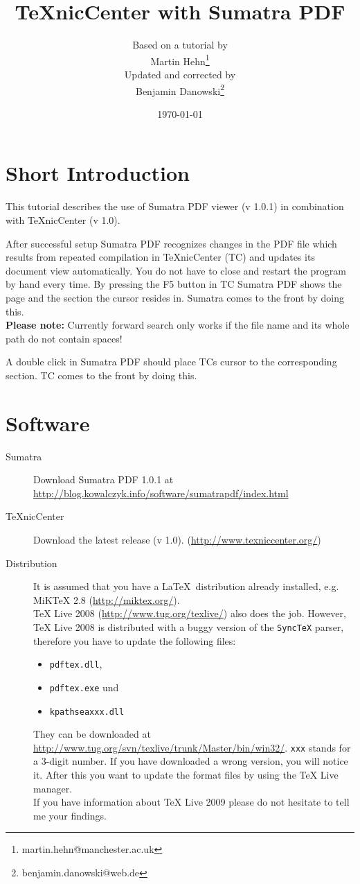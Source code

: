 \documentclass[parskip=half-]{scrartcl}
\title{TeXnicCenter with Sumatra PDF}
\author{Based on a tutorial by\\
Martin Hehn\thanks{martin.hehn@manchester.ac.uk}\\
Updated and corrected by\\
Benjamin Danowski\thanks{benjamin.danowski@web.de}}
\date{\today}
\begin{document}
\maketitle
\tableofcontents
\section{Short Introduction}
This tutorial describes the use of Sumatra PDF viewer (v 1.0.1) in combination with TeXnicCenter (v 1.0).

After successful setup Sumatra PDF recognizes changes in the PDF file which results from repeated compilation in TeXnicCenter (TC) and updates its document view automatically. You do not have to close and restart the program by hand every time. By pressing the F5 button in TC Sumatra PDF shows the page and the section the cursor resides in. Sumatra comes to the front by doing this.\\
\textbf{Please note:} Currently forward search only works if the file name and its whole path do not contain spaces!

A double click in Sumatra PDF should place TCs cursor to the corresponding section. TC comes to the front by doing this.

\section{Software}

\begin{description}
	\item[Sumatra] Download Sumatra PDF 1.0.1 at \url{http://blog.kowalczyk.info/software/sumatrapdf/index.html} 
	\item[TeXnicCenter] Download the latest release (v 1.0). (\url{http://www.texniccenter.org/})
	\item[Distribution] It is assumed that you have a \LaTeX\ distribution already installed, e.g. MiKTeX 2.8 (\url{http://miktex.org/}).\\
TeX Live 2008 (\url{http://www.tug.org/texlive/}) also does the job. However, TeX Live 2008 is distributed with a buggy version of the \texttt{SyncTeX} parser, therefore you have to update the following files:
\begin{itemize}
	\item \texttt{pdftex.dll},
	\item \texttt{pdftex.exe} und
	\item \texttt{kpathseaxxx.dll}
\end{itemize}
They can be downloaded at \url{http://www.tug.org/svn/texlive/trunk/Master/bin/win32/}. \texttt{xxx} stands for a 3-digit number. If you have downloaded a wrong version, you will notice it. After this you want to update the format files by using the TeX Live manager.\\
If you have information about TeX Live 2009 please do not hesitate to tell me your findings.
\end{description}
\end{document}
